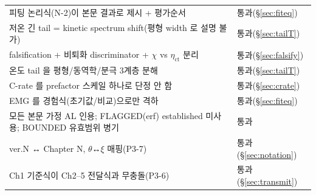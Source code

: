 \documentclass[11pt,a4paper]{article}
\begin{document}
\begin{longtable}{p{} p{}}
피팅 논리식(N-2)이 본문 결과로 제시 + 평가순서 & 통과(\S\ref{sec:fiteq}) \\
저온 긴 tail = kinetic spectrum shift(평형 width 로 설명 불가) & 통과(\S\ref{sec:tailT}) \\
falsification + 비퇴화 discriminator + $\chi$ vs $\eta_\mathrm{ct}$ 분리 & 통과(\S\ref{sec:falsify}) \\
온도 tail 을 평형/동역학/분극 3계층 분해 & 통과(\S\ref{sec:tailT}) \\
C-rate 를 prefactor 스케일 하나로 단정 안 함 & 통과(\S\ref{sec:crate}) \\
EMG 를 경험식(초기값/비교)으로만 격하 & 통과(\S\ref{sec:fiteq}) \\
모든 본문 가정 AL 인용; FLAGGED(erf) established 미사용; BOUNDED 유효범위 병기 & 통과 \\
ver.N ↔ Chapter N, $\theta$↔$\xi$ 매핑(P3-7) & 통과(\S\ref{sec:notation}) \\
Ch1 기준식이 Ch2--5 전달식과 무충돌(P3-6) & 통과(\S\ref{sec:transmit}) \\
\bottomrule
\end{longtable}
\end{document}
